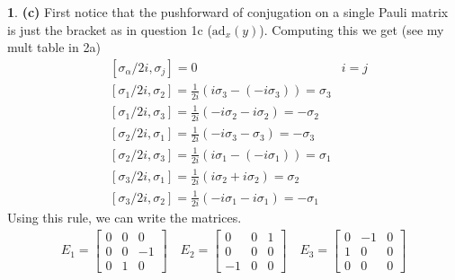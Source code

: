 \documentclass[10.5pt]{article}
\theoremstyle{definition}
\newtheorem{pb}{}
\begin{document}
\begin{pb}
        \textbf{(c)} First notice that the pushforward of conjugation on a single Pauli matrix is just the bracket as in question 1c (\(\text{ad}_x(y)\)). Computing this we get (see my mult table in 2a)
        \begin{align*}
            &[\sigma_\alpha/2i,\sigma_j] = 0 &i=j \\
            &[\sigma_1/2i,\sigma_2] = \frac{1}{2i}(i\sigma_3 - (-i\sigma_3)) = \sigma_3 \\
            &[\sigma_1/2i,\sigma_3] = \frac{1}{2i}(-i\sigma_2 - i\sigma_2) = -\sigma_2 \\
            &[\sigma_2/2i,\sigma_1] = \frac{1}{2i}(-i \sigma_3 - \sigma_3) = -\sigma_3 \\
            &[\sigma_2/2i,\sigma_3] = \frac{1}{2i}(i \sigma_1 - (-i\sigma_1)) = \sigma_1 \\
            &[\sigma_3/2i,\sigma_1] = \frac{1}{2i}(i\sigma_2 + i\sigma_2) = \sigma_2 \\
            &[\sigma_3/2i,\sigma_2] = \frac{1}{2i}(-i \sigma_1 - i \sigma_1) = -\sigma_1
        \end{align*}
        Using this rule, we can write the matrices.
        \begin{align*}
            E_1 = \begin{bmatrix} 0 & 0 & 0 \\ 0 & 0 & -1 \\ 0 & 1 & 0 \end{bmatrix} \quad E_2 = \begin{bmatrix} 0 & 0 & 1 \\ 0 & 0 & 0 \\ -1 & 0 & 0 \end{bmatrix} \quad 
            E_3 = \begin{bmatrix} 0 & -1 & 0 \\ 1 & 0 & 0 \\ 0 & 0 & 0 \end{bmatrix}
        \end{align*}


\end{pb}
\end{document}

